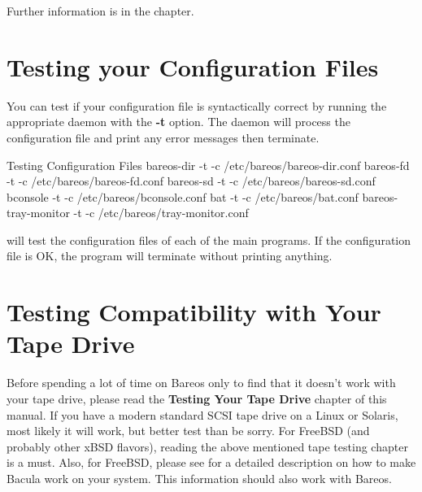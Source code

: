 Further information is in the
 chapter.

\section{Testing your Configuration Files}

You can test if your configuration file is syntactically correct by running
the appropriate daemon with the {\bf -t} option. The daemon will process the
configuration file and print any error messages then terminate.

\begin{commands}{Testing Configuration Files}
bareos-dir -t -c /etc/bareos/bareos-dir.conf
bareos-fd -t -c /etc/bareos/bareos-fd.conf
bareos-sd -t -c /etc/bareos/bareos-sd.conf
bconsole -t -c /etc/bareos/bconsole.conf
bat -t -c /etc/bareos/bat.conf
bareos-tray-monitor -t -c /etc/bareos/tray-monitor.conf
\end{commands}

will test the configuration files of each of the main programs. If the
configuration file is OK, the program will terminate without printing
anything.
\label{TapeTesting}

\section{Testing Compatibility with Your Tape Drive}

Before spending a lot of time on Bareos only to find that it doesn't work
with your tape drive, please read the {\bf Testing Your Tape
Drive} chapter of this manual.
If you have a modern
standard SCSI tape drive on a Linux or Solaris, most likely it will work,
but better test than be sorry.  For FreeBSD (and probably other xBSD
flavors), reading the above mentioned tape testing chapter is a must.
Also, for FreeBSD, please see  for a detailed description
on how to make Bacula work on your system. 
This information should also work with Bareos. 


